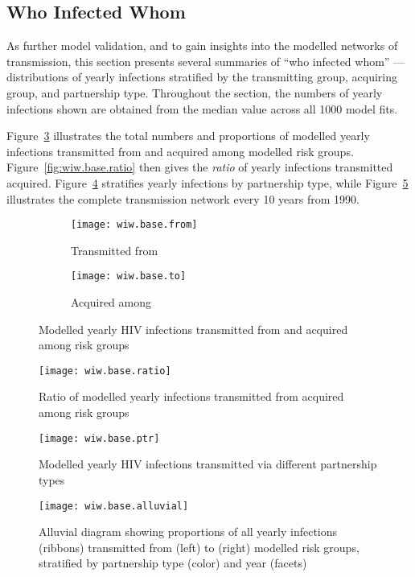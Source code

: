 \subsection{Who Infected Whom}\label{sr.cal.wiw}
As further model validation, and to gain insights into the modelled networks of transmission,
this section presents several summaries of ``who infected whom''
--- \ie distributions of yearly infections stratified by
the transmitting group, acquiring group, and partnership type.
Throughout the section, the numbers of yearly infections shown are obtained from
the median value across all 1000 model fits.
\par
Figure~\ref{fig:wiw.base.frto} illustrates
the total numbers and proportions of modelled yearly infections
transmitted from  and
acquired among  modelled risk groups.
Figure~\ref{fig:wiw.base.ratio} then gives
the \emph{ratio} of yearly infections transmitted \vs acquired.
Figure~\ref{fig:wiw.base.ptr} stratifies yearly infections by partnership type, while
Figure~\ref{fig:wiw.base.alluvial} illustrates
the complete transmission network every 10 years from 1990.
\begin{figure}
  \begin{subfigure}{.5\linewidth}
    \texttt{[image: wiw.base.from]}
    \caption{Transmitted from}
    \label{fig:wiw.base.from}
  \end{subfigure}%
  \begin{subfigure}{.5\linewidth}
    \texttt{[image: wiw.base.to]}
    \caption{Acquired among}
    \label{fig:wiw.base.to}
  \end{subfigure}
  \caption{Modelled yearly HIV infections
     transmitted from and  acquired among risk groups}
  \label{fig:wiw.base.frto}
\end{figure}
\begin{figure}
  \begin{minipage}[b]{.49\linewidth}
    \texttt{[image: wiw.base.ratio]}
    \caption{Ratio of modelled yearly infections transmitted from \vs acquired among risk groups}
    \label{fig:wiw.base.ratio}
  \end{minipage}\hfill
  \begin{minipage}[b]{.49\linewidth}
    \texttt{[image: wiw.base.ptr]}
    \caption{Modelled yearly HIV infections transmitted via different partnership types}
    \label{fig:wiw.base.ptr}
  \end{minipage}
\end{figure}
\begin{figure}
  \texttt{[image: wiw.base.alluvial]}
  \caption{Alluvial diagram showing proportions of all yearly infections (ribbons)
    transmitted from (left) to (right) modelled risk groups,
    stratified by partnership type (color) and year (facets)}
  \label{fig:wiw.base.alluvial}
\end{figure}

